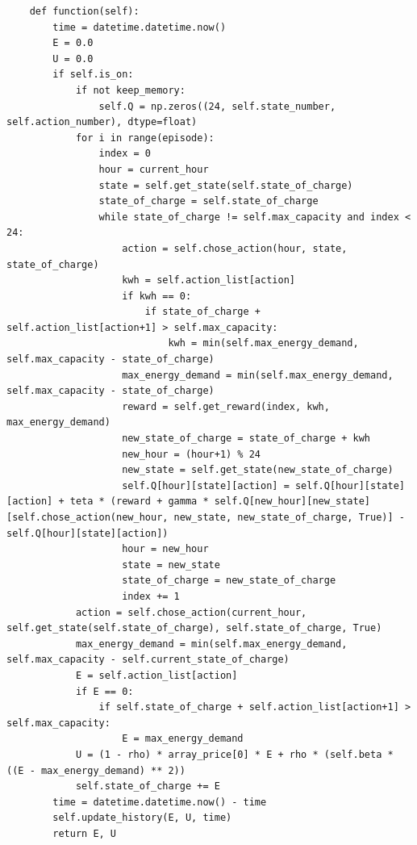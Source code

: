 \documentclass[italian, Lau, oneside]{sapthesis}
\begin{document}
\begin{verbatim}
    def function(self):
        time = datetime.datetime.now()
        E = 0.0
        U = 0.0
        if self.is_on:
            if not keep_memory:
                self.Q = np.zeros((24, self.state_number, self.action_number), dtype=float)
            for i in range(episode):
                index = 0
                hour = current_hour
                state = self.get_state(self.state_of_charge)
                state_of_charge = self.state_of_charge
                while state_of_charge != self.max_capacity and index < 24:
                    action = self.chose_action(hour, state, state_of_charge)
                    kwh = self.action_list[action]
                    if kwh == 0:
                        if state_of_charge + self.action_list[action+1] > self.max_capacity:
                            kwh = min(self.max_energy_demand, self.max_capacity - state_of_charge) 
                    max_energy_demand = min(self.max_energy_demand, self.max_capacity - state_of_charge)
                    reward = self.get_reward(index, kwh, max_energy_demand)
                    new_state_of_charge = state_of_charge + kwh
                    new_hour = (hour+1) % 24
                    new_state = self.get_state(new_state_of_charge)
                    self.Q[hour][state][action] = self.Q[hour][state][action] + teta * (reward + gamma * self.Q[new_hour][new_state][self.chose_action(new_hour, new_state, new_state_of_charge, True)] - self.Q[hour][state][action])
                    hour = new_hour
                    state = new_state
                    state_of_charge = new_state_of_charge
                    index += 1
            action = self.chose_action(current_hour, self.get_state(self.state_of_charge), self.state_of_charge, True)
            max_energy_demand = min(self.max_energy_demand, self.max_capacity - self.current_state_of_charge)
            E = self.action_list[action]
            if E == 0:
                if self.state_of_charge + self.action_list[action+1] > self.max_capacity:
                    E = max_energy_demand
            U = (1 - rho) * array_price[0] * E + rho * (self.beta * ((E - max_energy_demand) ** 2))
            self.state_of_charge += E
        time = datetime.datetime.now() - time
        self.update_history(E, U, time)
        return E, U
\end{verbatim}
\end{document}
